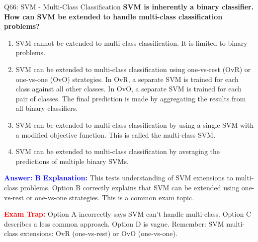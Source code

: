 \documentclass[8pt]{beamer}
\begin{document}
	\begin{frame}{Q66: SVM - Multi-Class Classification}
		\fontsize{6.5}{7.5}\selectfont
		\textbf{SVM is inherently a binary classifier. How can SVM be extended to handle multi-class classification problems?}
		
		\begin{enumerate}
			\item SVM cannot be extended to multi-class classification. It is limited to binary problems.
			\item SVM can be extended to multi-class classification using one-vs-rest (OvR) or one-vs-one (OvO) strategies. In OvR, a separate SVM is trained for each class against all other classes. In OvO, a separate SVM is trained for each pair of classes. The final prediction is made by aggregating the results from all binary classifiers.
			\item SVM can be extended to multi-class classification by using a single SVM with a modified objective function. This is called the multi-class SVM.
			\item SVM can be extended to multi-class classification by averaging the predictions of multiple binary SVMs.
		\end{enumerate}
		
		\vspace{0.1cm}
		\textcolor{blue}{\textbf{Answer: B}}
		\vspace{0.1cm}
		\textcolor{blue}{\textbf{Explanation:}} This tests understanding of SVM extensions to multi-class problems. Option B correctly explains that SVM can be extended using one-vs-rest or one-vs-one strategies. This is a common exam topic.
		
		\textcolor{red}{\textbf{Exam Trap:}} Option A incorrectly says SVM can't handle multi-class. Option C describes a less common approach. Option D is vague. Remember: SVM multi-class extensions: OvR (one-vs-rest) or OvO (one-vs-one).
	\end{frame}
	
\end{document}
